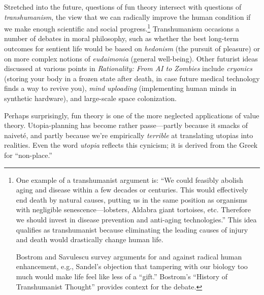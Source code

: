 {
 Stretched into the future, questions of fun theory intersect with
questions of \textit{transhumanism}, the view that we can radically
improve the human condition if we make enough scientific and social
progress.\footnote{One example of a transhumanist argument is:
``We could feasibly abolish aging and disease within a
few decades or centuries. This would effectively end death by natural
causes, putting us in the same position as organisms with negligible
senescence---lobsters, Aldabra giant tortoises, etc. Therefore we
should invest in disease prevention and anti-aging
technologies.'' This idea qualifies as transhumanist
because eliminating the leading causes of injury and death would
drastically change human life.

 Bostrom and Savulescu survey arguments for and against radical
human enhancement, e.g., Sandel's objection that
tampering with our biology too much would make life feel like less of a
``gift.''\footnotemark\supercomma\footnotemark
Bostrom's ``History of Transhumanist
Thought'' provides context for the
debate.\footnotemark{}}
\footnext{}
\footnext{}
\footnext{} Transhumanism occasions a number of
debates in moral philosophy, such as whether the best long-term
outcomes for sentient life would be based on \textit{hedonism} (the
pursuit of pleasure) or on more complex notions of \textit{eudaimonia}
(general well-being). Other futurist ideas discussed at various points
in \textit{Rationality: From AI to Zombies} include \textit{cryonics}
(storing your body in a frozen state after death, in case future
medical technology finds a way to revive you), \textit{mind uploading}
(implementing human minds in synthetic hardware), and large-scale space
colonization.}

{
 Perhaps surprisingly, fun theory is one of the more neglected
applications of value theory. Utopia-planning has become rather
passe---partly because it smacks of naiveté, and partly because
we're empirically \textit{terrible} at translating
utopias into realities. Even the word \textit{utopia} reflects this
cynicism; it is derived from the Greek for
``non-place.''}

